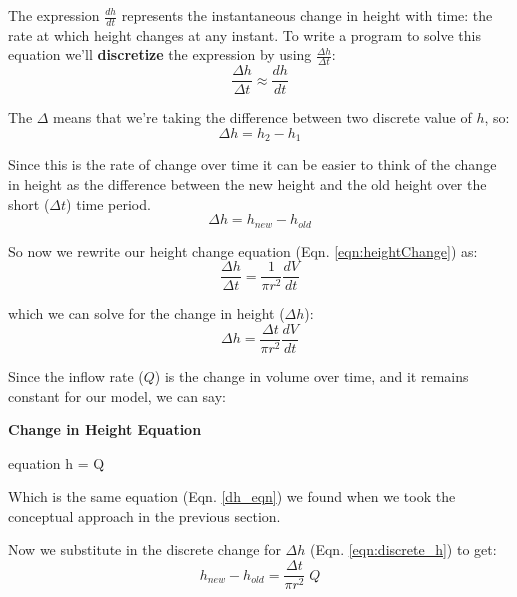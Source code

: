 \documentclass[11pt,fleqn]{book}
\begin{document}
	The expression $\frac{dh}{dt}$ represents the instantaneous change in height with time: the rate at which height changes at any instant. To write a program to solve this equation we'll \textbf{discretize} the expression by using $\frac{\Delta h}{\Delta t}$:
		\begin{equation}
			\frac{\Delta h}{\Delta t} \approx \frac{dh}{dt} 
		\end{equation}
		
	The $\Delta$ means that we're taking the difference between two discrete value of $h$, so:
		\begin{equation}
			\Delta h = h_2 - h_1
		\end{equation}
	
	Since this is the rate of change over time it can be easier to think of the change in height as the difference between the new height and the old height over the short ($\Delta t$) time period.
		\begin{equation}
			\label{eqn:discrete_h}
			\Delta h = h_{new} - h_{old}
		\end{equation}
	
	So now we rewrite our height change equation (Eqn. \ref{eqn:heightChange}) as:
		\begin{equation}
			\frac{\Delta h}{\Delta t} = \frac{1 }{\pi r^2 } \frac{dV}{dt}
		\end{equation}
		
	which we can solve for the change in height ($\Delta h$):
		\begin{equation}
		\Delta h = \frac{\Delta t }{\pi r^2 } \frac{dV}{dt}
		\end{equation}
	
	Since the inflow rate ($Q$) is the change in volume over time, and it remains constant for our model, we can say:
	
	\textbf{Change in Height Equation}
		\begin{empheq}[box=\fbox]{equation}
			\label{eqn:dh_calc}
			\Delta h = \frac{\Delta t }{\pi r^2 } \; Q
		\end{empheq}
	
	Which is the same equation (Eqn. \ref{dh_eqn}) we found when we took the conceptual approach in the previous section.
	
	Now we substitute in the discrete change for $\Delta h$ (Eqn. \ref{eqn:discrete_h}) to get:
		\begin{equation}
			 h_{new} - h_{old} =  \; Q
		\end{equation}
	
\end{document}
